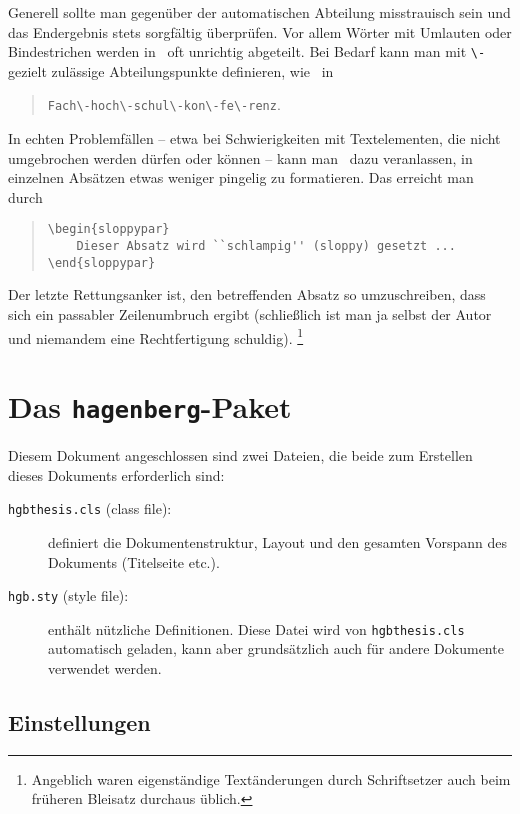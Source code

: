 Generell sollte man gegenüber der automatischen Abteilung
misstrauisch sein und das Endergebnis stets sorgfältig überprüfen.
Vor allem Wörter mit Umlauten oder Bindestrichen werden in \latex\ 
oft unrichtig abgeteilt.
Bei Bedarf kann man mit \verb!\-! gezielt zulässige Abteilungspunkte 
definieren, wie \zB\ in
%
\begin{quote}
\verb!Fach\-hoch\-schul\-kon\-fe\-renz!.
\end{quote}
%
In echten Problemfällen -- etwa bei Schwierigkeiten mit Textelementen, die nicht umgebrochen 
werden dürfen oder können -- kann man \latex\ dazu veranlassen, in einzelnen Absätzen
etwas weniger pingelig zu formatieren. Das erreicht man durch
%
\begin{quote}
\begin{verbatim}
\begin{sloppypar}
    Dieser Absatz wird ``schlampig'' (sloppy) gesetzt ...
\end{sloppypar}
\end{verbatim}
\end{quote}
%
Der letzte Rettungsanker ist, den betreffenden Absatz so umzuschreiben, dass sich ein passabler Zeilenumbruch ergibt (schließlich ist man ja selbst der Autor und niemandem eine
Rechtfertigung schuldig).%
\footnote{Angeblich waren eigenständige Textänderungen durch Schriftsetzer
auch beim früheren Bleisatz durchaus üblich.}



\section{Das {\tt hagenberg}-Paket}

Diesem Dokument angeschlossen sind zwei Dateien, die beide zum Erstellen dieses Dokuments erforderlich sind:
%
\begin{description}
\item[\nolinkurl{hgbthesis.cls} (class file):] definiert die 
		Dokumentenstruktur, Layout und den gesamten Vorspann des Dokuments (Titelseite etc.).
\item[\nolinkurl{hgb.sty} (style file):] enthält nützliche 
		Definitionen. Diese Datei wird von \nolinkurl{hgbthesis.cls} automatisch geladen, kann 
		aber grundsätzlich auch für andere Dokumente verwendet werden.
\end{description}


\subsection{Einstellungen}
\label{sec:HagenbergEinstellungen}


